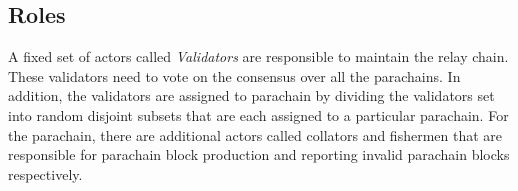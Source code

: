\subsection{Roles}
A fixed set of actors called \emph{Validators} are responsible to maintain the relay chain.
These validators need to vote on the consensus over all the parachains.
In addition, the validators are assigned to parachain by dividing the validators set into
random disjoint subsets that are each assigned to a particular parachain.
For the parachain, there are additional actors called collators and fishermen that are
responsible for parachain block production and reporting invalid parachain blocks respectively.
